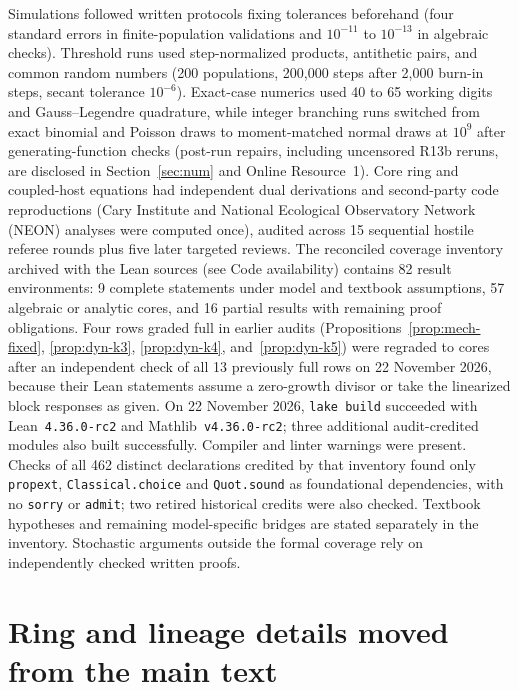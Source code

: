 Simulations followed written protocols fixing tolerances beforehand (four standard errors in finite-population validations and $10^{-11}$ to $10^{-13}$ in algebraic checks). Threshold runs used step-normalized products, antithetic pairs, and common random numbers (200 populations, 200,000 steps after 2,000 burn-in steps, secant tolerance $10^{-6}$). Exact-case numerics used 40 to 65 working digits and Gauss--Legendre quadrature, while integer branching runs switched from exact binomial and Poisson draws to moment-matched normal draws at $10^9$ after generating-function checks (post-run repairs, including uncensored R13b reruns, are disclosed in Section~\ref{sec:num} and Online Resource~1). Core ring and coupled-host equations had independent dual derivations and second-party code reproductions (Cary Institute and National Ecological Observatory Network (NEON) analyses were computed once), audited across 15 sequential hostile referee rounds plus five later targeted reviews. The reconciled coverage inventory archived with the Lean sources (see Code availability) contains 82 result environments: 9 complete statements under model and textbook assumptions, 57 algebraic or analytic cores, and 16 partial results with remaining proof obligations. Four rows graded full in earlier audits (Propositions~\ref{prop:mech-fixed}, \ref{prop:dyn-k3}, \ref{prop:dyn-k4}, and~\ref{prop:dyn-k5}) were regraded to cores after an independent check of all 13 previously full rows on 22 November 2026, because their Lean statements assume a zero-growth divisor or take the linearized block responses as given. On 22 November 2026, \texttt{lake build} succeeded with Lean~\texttt{4.36.0-rc2} and Mathlib~\texttt{v4.36.0-rc2}; three additional audit-credited modules also built successfully. Compiler and linter warnings were present. Checks of all 462 distinct declarations credited by that inventory found only \texttt{propext}, \texttt{Classical.choice} and \texttt{Quot.sound} as foundational dependencies, with no \texttt{sorry} or \texttt{admit}; two retired historical credits were also checked. Textbook hypotheses and remaining model-specific bridges are stated separately in the inventory. Stochastic arguments outside the formal coverage rely on independently checked written proofs.


\section{Ring and lineage details moved from the main text}\label{esm:ring-bounds-details}

